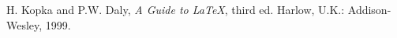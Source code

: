 \documentclass[10pt,journal,cspaper,compsoc]{IEEEtran}
\begin{document}
%
%
%
\begin{thebibliography}{1}

H. Kopka and P.W. Daly, \emph{A Guide to {\LaTeX}}, third ed. Harlow, U.K.: Addison-Wesley, 1999.





\end{thebibliography}

% 
\end{document}

